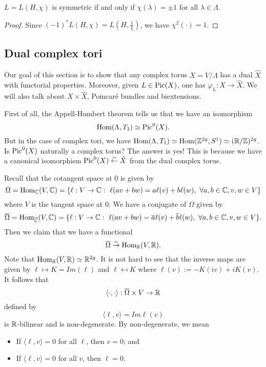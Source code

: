 \begin{lemma}
$L=L(H,\chi)$ is symmetric if and only if $\chi(\lambda)=\pm 1$ for all $\lambda\in \Lambda$. 
\end{lemma}

\begin{proof}
Since $(-1)^* L(H,\chi)=L(H,\frac{1}{\chi})$, we have $\chi^2(\cdot )=1$.
\end{proof}

\subsection{Dual complex tori}
Our goal of this section is to show that any complex torus $X=V/\Lambda$ has a dual $\hat{X}$ with functorial properties. Moreover, given $L\in \operatorname{Pic}(X)$, one has $\varphi_L:X\to \hat{X}$. We will also talk about $X\times \hat{X}$, Poincar\'{e} bundles and biextensions. 

First of all, the Appell-Humbert theorem tells us that we have an isomorphism 
$$\operatorname{Hom}(\Lambda,T_1)\simeq \operatorname{Pic}^0(X).$$
But in the case of complex tori, we have $\operatorname{Hom}(\Lambda,T_1)\simeq \operatorname{Hom}({\mathbb Z}^{2g},S^1)\simeq ({\mathbb R}/{\mathbb Z})^{2g}$. Is $\operatorname{Pic}^0(X)$ naturally a complex torus? The answer is yes! This is because we have a canonical isomorphism $\operatorname{Pic}^0(X)\overset{\sim}{\leftarrow} \hat{X}$ from the dual complex torus. 

Recall that the cotangent space at $\underline{0}$ is given by 
$$\Omega=\Hom_\CC(V,\CC)=\{\ell:V\to \CC:\ \ell(av+bw)=a\ell(v)+b\ell(w),\ \forall a,b\in \CC, v,w\in V \}$$ where $V$ is the tangent space at $0$. We have a conjugate of $\Omega$ given by
$$\overline{\Omega}=\operatorname{Hom}_{\overline{{\mathbb C}}}(V,{\mathbb C})=\{\ell:V\to {\mathbb C}:\ \ell(av+bw)=\overline{a}\ell(v)+\overline{b}\ell(w),\ \forall a,b\in {\mathbb C}, v,w\in V \}.$$
Then we claim that we have a functional 
$$\overline{\Omega}\overset{\sim}{\rightarrow} \operatorname{Hom}_{\mathbb R}(V,{\mathbb R}).$$
Note that $\operatorname{Hom}_{\mathbb R}(V,{\mathbb R})\simeq {\mathbb R}^{2g}$.
It is not hard to see that the inverse maps are given by $\ell \mapsto K=Im (\ell)$ and $\ell \mapsfrom K$ where $\ell(v):=-K(iv)+iK(v)$. It follows that 
$$\langle \cdot, \cdot \rangle:\overline{\Omega}\times V\to {\mathbb R}$$
defined by 
$$\langle \ell, v\rangle = Im \ell(v)$$
is ${\mathbb R}$-bilinear and is non-degenerate. 
By non-degenerate, we mean
\begin{itemize}
\item If $\langle \ell,v\rangle=0$ for all $\ell$, then $v=0$; and
\item If $\langle \ell,v\rangle=0$ for all $v$, then $\ell=0$.
\end{itemize}


